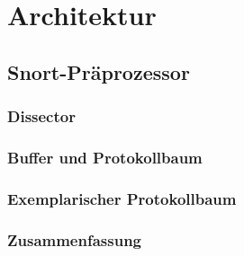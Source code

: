 \documentclass[18pt]{beamer}
\begin{document}
\section{Architektur}
	
	
	
	
	
	
	
	
	
	
	
	
	
	
	
	
	
	
	
	

\iffalse
\subsection{Snort-Präprozessor}
	\subsubsection{Dissector}
		
		
		
		
		
		
		
	\subsubsection{Buffer und Protokollbaum}
		
	\subsubsection{Exemplarischer Protokollbaum}
		
	\subsubsection{Zusammenfassung}
		
\end{document}
